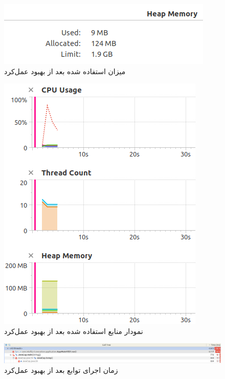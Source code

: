 \begin{figure}[!hbpt]
	\centering
	\includegraphics[scale=0.5]{./img/after/3.png}
	\caption{میزان  استفاده شده بعد از بهبود عمل‌کرد}
\end{figure}

\begin{figure}[!hbpt]
	\centering
	\includegraphics[scale=0.4]{./img/after/1.png}
	\caption{نمودار منابع استفاده شده بعد از بهبود عمل‌کرد}
\end{figure}

\begin{figure}[!hbpt]
	\centering
	\includegraphics[width=\linewidth]{./img/after/4.png}
	\caption{زمان اجرای توابع بعد از بهبود عمل‌کرد}
\end{figure}